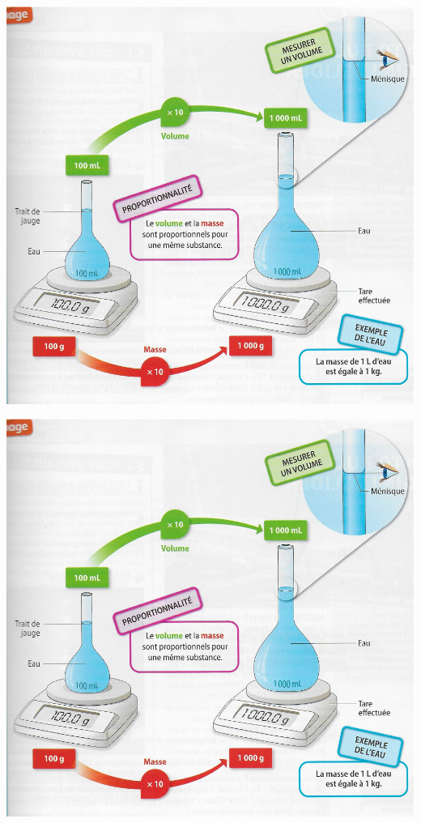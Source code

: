 \documentclass[12pt,a4paper]{article}
\begin{document}
	
\graphicspath{{./img/}}	
%
%
%
%

	\begin{center}
		\includegraphics[scale=0.3]{img/bilan}
	\end{center}

\vspace*{1cm}
	\begin{center}
	\includegraphics[scale=0.3]{img/bilan}
\end{center}

\appendix

\end{document}

